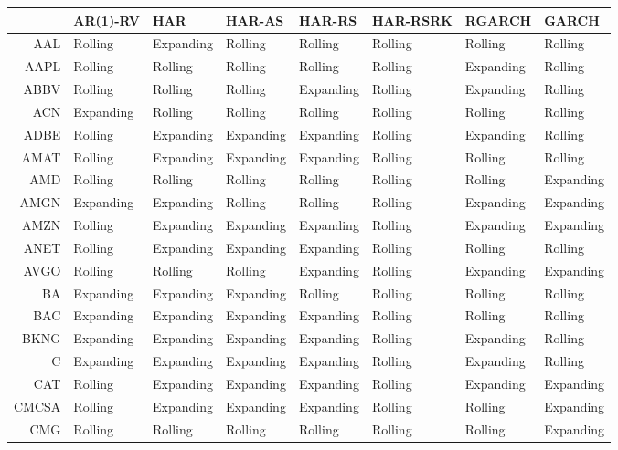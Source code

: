 \begin{table}[ht]
\centering
\begin{tabular}{rlllllll}
  \hline
 & AR(1)-RV & HAR & HAR-AS & HAR-RS & HAR-RSRK & RGARCH & GARCH \\ 
  \hline
AAL & Rolling & Expanding & Rolling & Rolling & Rolling & Rolling & Rolling \\ 
  AAPL & Rolling & Rolling & Rolling & Rolling & Rolling & Expanding & Rolling \\ 
  ABBV & Rolling & Rolling & Rolling & Expanding & Rolling & Expanding & Rolling \\ 
  ACN & Expanding & Rolling & Rolling & Rolling & Rolling & Rolling & Rolling \\ 
  ADBE & Rolling & Expanding & Expanding & Expanding & Rolling & Expanding & Rolling \\ 
  AMAT & Rolling & Expanding & Expanding & Expanding & Rolling & Rolling & Rolling \\ 
  AMD & Rolling & Rolling & Rolling & Rolling & Rolling & Rolling & Expanding \\ 
  AMGN & Expanding & Expanding & Rolling & Rolling & Rolling & Expanding & Expanding \\ 
  AMZN & Rolling & Expanding & Expanding & Expanding & Rolling & Expanding & Expanding \\ 
  ANET & Rolling & Expanding & Expanding & Expanding & Rolling & Rolling & Rolling \\ 
  AVGO & Rolling & Rolling & Rolling & Expanding & Rolling & Expanding & Expanding \\ 
  BA & Expanding & Expanding & Expanding & Rolling & Rolling & Rolling & Rolling \\ 
  BAC & Expanding & Expanding & Expanding & Expanding & Rolling & Rolling & Rolling \\ 
  BKNG & Expanding & Expanding & Expanding & Expanding & Rolling & Expanding & Rolling \\ 
  C & Expanding & Expanding & Expanding & Expanding & Rolling & Expanding & Rolling \\ 
  CAT & Rolling & Expanding & Expanding & Expanding & Rolling & Expanding & Expanding \\ 
  CMCSA & Rolling & Expanding & Expanding & Expanding & Rolling & Rolling & Expanding \\ 
  CMG & Rolling & Rolling & Rolling & Rolling & Rolling & Rolling & Expanding \\ 

\end{tabular}
\end{table}

